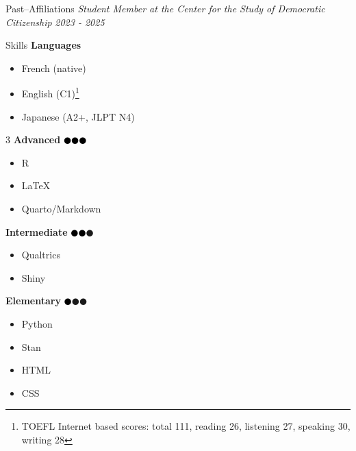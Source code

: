 \documentclass{resume} %
\begin{document}
\begin{rSection}{Past--Affiliations}
	{\em Student Member at the Center for the Study of Democratic Citizenship} \hfill{\em 2023 - 2025} \par
\end{rSection}

\begin{rSection}{Skills}
	{\bf Languages}
	\begin{itemize}
		\item French (native)
		\item English (C1)\footnote{TOEFL Internet based scores: total 111, reading 26, listening 27, speaking 30, writing 28}
		\item Japanese (A2+, JLPT N4)
	\end{itemize}

	\vspace{0.5cm}

	\begin{multicols}{3}
		\raggedcolumns
		\textbf{Advanced} \textcolor{black}{$\CIRCLE\CIRCLE\CIRCLE$}
		\begin{itemize}
			\item R
			\item \LaTeX
			\item Quarto/Markdown
		\end{itemize}
		\columnbreak
		\textbf{Intermediate} \textcolor{black}{$\CIRCLE\CIRCLE$}\textcolor{gray!60}{$\CIRCLE$}
		\begin{itemize}
			\item Qualtrics
			\item Shiny
		\end{itemize}
		\columnbreak
		\textbf{Elementary} \textcolor{black}{$\CIRCLE$}\textcolor{gray!60}{$\CIRCLE\CIRCLE$}
		\begin{itemize}
			\item Python
			\item Stan
			\item HTML
			\item CSS
		\end{itemize}
	\end{multicols}

\end{rSection}
\end{document}
